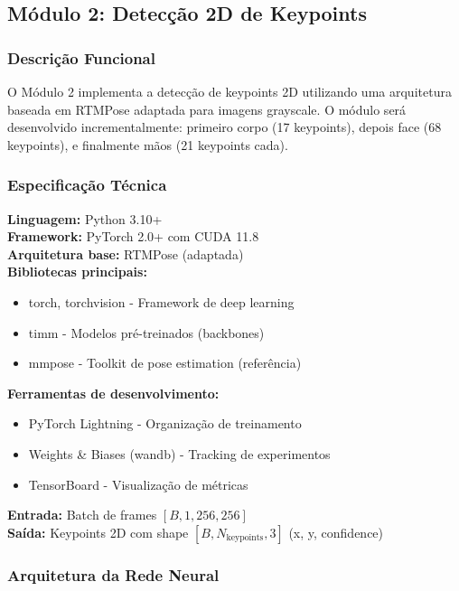 \documentclass[12pt, a4paper]{article}
\begin{document}
\subsection{Módulo 2: Detecção 2D de Keypoints}

\subsubsection{Descrição Funcional}

O Módulo 2 implementa a detecção de keypoints 2D utilizando uma arquitetura baseada em RTMPose adaptada para imagens grayscale. O módulo será desenvolvido incrementalmente: primeiro corpo (17 keypoints), depois face (68 keypoints), e finalmente mãos (21 keypoints cada).

\subsubsection{Especificação Técnica}

\textbf{Linguagem:} Python 3.10+\\
\textbf{Framework:} PyTorch 2.0+ com CUDA 11.8\\
\textbf{Arquitetura base:} RTMPose (adaptada)\\
\textbf{Bibliotecas principais:}
\begin{itemize}
    \item torch, torchvision - Framework de deep learning
    \item timm - Modelos pré-treinados (backbones)
    \item mmpose - Toolkit de pose estimation (referência)
\end{itemize}

\textbf{Ferramentas de desenvolvimento:}
\begin{itemize}
    \item PyTorch Lightning - Organização de treinamento
    \item Weights \& Biases (wandb) - Tracking de experimentos
    \item TensorBoard - Visualização de métricas
\end{itemize}

\textbf{Entrada:} Batch de frames $[B, 1, 256, 256]$\\
\textbf{Saída:} Keypoints 2D com shape $[B, N_{\mathrm{keypoints}}, 3]$ (x, y, confidence)

\subsubsection{Arquitetura da Rede Neural}
\end{document}
